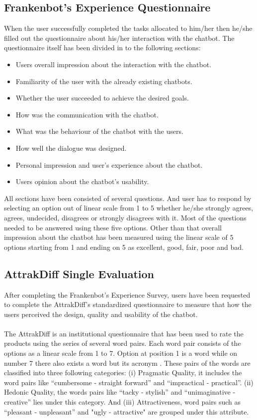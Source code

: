 \subsection{Frankenbot's Experience Questionnaire}
When the user successfully completed the tasks allocated to him/her then he/she filled out the questionnaire about his/her interaction with the chatbot. The questionnaire itself has been divided in to the following sections:
\begin{itemize}
    \item Users overall impression about the interaction with the chatbot.
    \item Familiarity of the user with the already existing chatbots.
    \item Whether the user succeeded to achieve the desired goals.
    \item How was the communication with the chatbot.
    \item What was the behaviour of the chatbot with the users.
    \item How well the dialogue was designed.
    \item Personal impression and user's experience about the chatbot.
    \item Users opinion about the chatbot's usability. 
\end{itemize} 
All sections have been consisted of several questions. And user has to respond by selecting an option out of linear scale from 1 to 5 whether he/she strongly agrees, agrees, undecided, disagrees or strongly disagrees with it. Most of the questions needed to be answered using these five options. Other than that overall impression about the chatbot has been measured using the linear scale of 5 options starting from 1 and ending on 5 as excellent, good, fair, poor and bad.

\subsection{AttrakDiff Single Evaluation}
After completing the Frankenbot's Experience Survey, users have been requested to complete the AttrakDiff's standardized questionnaire to measure that how the users perceived the design, quality and usability of the chatbot.
\\~\\
The AttrakDiff is an institutional questionnaire that has been used to rate the products using the series of several word pairs. Each word pair consists of the options as a linear scale from 1 to 7. Option at position 1 is a word while on number 7 there also exists a word but its acronym \cite{attrakdiffQuest}. These pairs of the words are classified into three following categories: (i) Pragmatic Quality, it includes the word pairs like “cumbersome - straight forward” and “impractical - practical”. (ii) Hedonic Quality, the words pairs like “tacky - stylish” and “unimaginative - creative” lies under this category. And (iii) Attractiveness, word pairs such as “pleasant - unpleasant” and "ugly - attractive" are grouped under this attribute. \cite{alex}
\\~\\

